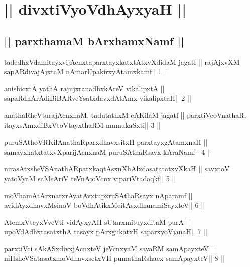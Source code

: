 \chapter{|| divxtiVyoV\s dhAyxyaH ||}

\section{|| parxthamaM bArxhamxNamf ||}

\begin{shl}
tadedhxVdamitayxvijAcnxtaparxtayxkatxtAtxvXdidaM jagatf ||
rajAjxvXM sapARdivajAjxtaM nAmarUpakirxyAtamxkamf\hfill || 1 ||
\end{shl}

\begin{shl}
anishicxtA yathA rajujxranadhxkAreV vikalipxtA ||
sapaRdhArAdiBiBARveYsatxdavxdAtAmx vikalipxtaH\hfill || 2 ||
\end{shl}

\begin{shl}
anathaRheVturajAcnxnaM, tadutathxM cAKilaM jagatf ||
parxtiVcoV\s nathaR, itayxsAmxdiBxVtoV\s tayxthaRM mumukaSxti\hfill || 3 ||
\end{shl}

\begin{shl}
puruSAthoVR\s KilAnathaRparxdhavxsitxH parxtayxgAtamxnaH ||
samayxkatxtatxvXparijAcnxnaM puruSAthaRsayx kAraNamf\hfill || 4 ||
\end{shl}

\begin{shl}
nirasAtxsheVSAnathARpatxkaqtAsxnXhAlxdasatatatxvXkaH ||
savxtoV yatoV\s yaM saMsAriV teVnAjoVcnx vipariVtadaqkf\hfill || 5 ||
\end{shl}

\begin{shl}
moVhamAtArxnatxrAyatAvxtupxruSAthaRsayx nAparamf ||
avidAyxdhavxMsinoV boVdhAtikxMcitAsxdhanamiSayxteV\hfill || 6 ||
\end{shl}

\begin{shl}
AtemxVteyxVveVti vidAyxyAH sUtarxmituyxditaM purA ||
upoVdAdhxtasatxthA tasayx pArxgukatxH saparxyoVjanaH\hfill || 7 ||
\end{shl}

\begin{shl}
parxtiVci sAkASxdivxjAcnxteV jeVcnxyaM savaRM samApayxteV ||
niHsheVSatasatxmoVdhavxsetxVH pumathaRshacx samApayxteV\hfill || 8 ||
\end{shl}

